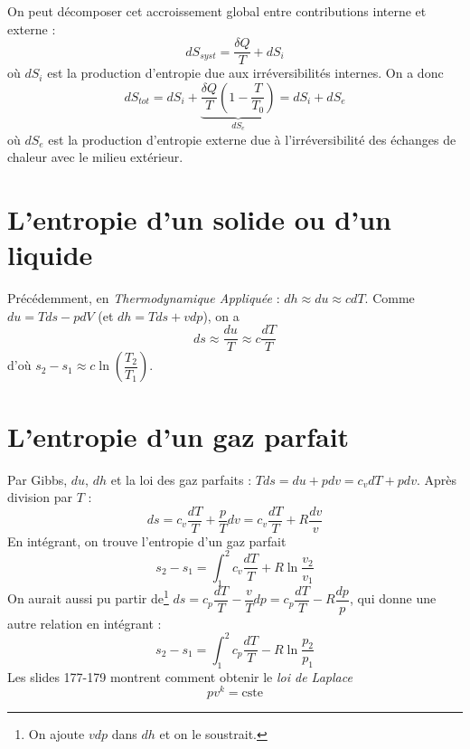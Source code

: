 	On peut décomposer cet accroissement global entre contributions interne et 
	externe :
	\begin{equation}
	dS_{syst} =  \dfrac{\delta Q}{T} + dS_i
	\end{equation}
	où $dS_i$ est la production d'entropie due aux irréversibilités internes.
	On a donc
	\begin{equation}
	dS_{tot} = dS_i + \underbrace{\dfrac{\delta Q}{T}\left(1-\dfrac{T}{T_0}\right)
	}_{dS_e} = dS_i+dS_e
	\end{equation}
	où $dS_e$ est la production d’entropie externe due à l'irréversibilité des 
	échanges de chaleur avec le milieu extérieur.
	
	\section{L'entropie d’un solide ou d’un liquide}
	Précédemment, en \textit{Thermodynamique Appliquée} : $dh\approx du \approx cdT$. 
	Comme $du = Tds-pdV$ (et $dh = Tds+vdp$), on a 
	\begin{equation}
	ds \approx \dfrac{du}{T} \approx c \dfrac{dT}{T}
	\end{equation}
	d'où $s_2-s_1 \approx c\ln\left(\dfrac{T_2}{T_1}\right)$.
	
	\section{L’entropie d’un gaz parfait}
	Par Gibbs, $du$, $dh$ et la loi des gaz parfaits : $Tds = du+pdv = c_vdT+pdv$. 
	Après division par $T$ :
	\begin{equation}
	ds = c_v \dfrac{dT}{T}+\dfrac{p}{T}dv = c_v\dfrac{dT}{T} +R\dfrac{dv}{v}
	\end{equation}
	En intégrant, on trouve l'entropie d'un gaz parfait
	\begin{equation}
	s_2 - s_1 = \int_1^2 c_v\dfrac{dT}{T}+R\ln\dfrac{v_2}{v_1}
	\end{equation}
	On aurait aussi pu partir de\footnote{On ajoute $vdp$ dans $dh$ et on le 
	soustrait.} $ds = c_p\dfrac{dT}{T}-\dfrac{v}{T}dp = c_p
	\dfrac{dT}{T}-R\dfrac{dp}{p}$, qui donne une autre relation en intégrant :
	\begin{equation}
	s_2 - s_1 = \int_1^2 c_p\dfrac{dT}{T}-R\ln\dfrac{p_2}{p_1}
	\end{equation}
	Les slides 177-179 montrent comment obtenir le \textit{loi de Laplace}
	\begin{equation}
	pv^k = \text{cste}
	\end{equation}
	
